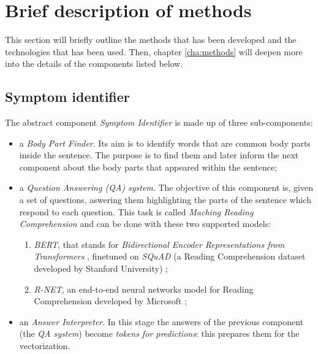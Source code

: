 \section{Brief description of methods}
\label{sec:brief_methods}

This section will briefly outline the methods that has been developed and the technologies that has been used. Then, chapter \ref{cha:methods} will deepen more into the details of the components listed below.

\subsection*{Symptom identifier}
The abstract component \textit{Symptom Identifier} is made up of three sub-components:
\begin{itemize}
  \item a \textit{Body Part Finder}. Its aim is to identify words that are common body parts inside the sentence. The purpose is to find them and later inform the next component about the body parts that appeared within the sentence;
  \item a \textit{Question Answering (QA) system}. The objective of this component is, given a set of questions, aswering them highlighting the parts of the sentence which respond to each question. This task is called \textit{Maching Reading Comprehension} and can be done with these two supported models:
    \begin{enumerate}
      \item \textit{BERT}, that stands for \textit{Bidirectional Encoder Representations from Transformers} \cite{bert}, finetuned on \textit{SQuAD} (a Reading Comprehension dataset developed by Stanford University) \cite{squad};
      \item \textit{R-NET}, an end-to-end neural networks model for Reading Comprehension developed by Microsoft  \cite{rnet};
    \end{enumerate}
  \item an \textit{Answer Interpreter}. In this stage the answers of the previous component (the \textit{QA system}) become \textit{tokens for predictions}: this prepares them for the vectorization.
\end{itemize}

